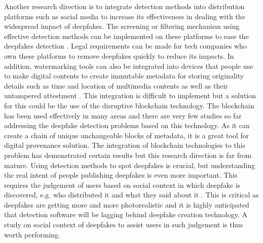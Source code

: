 Another research direction is to integrate detection methods into distribution platforms such as social media to increase its effectiveness in dealing with the widespread impact of deepfakes. The screening or filtering mechanism using effective detection methods can be implemented on these platforms to ease the deepfakes detection . Legal requirements can be made for tech companies who own these platforms to remove deepfakes quickly to reduce its impacts. In addition, watermarking tools can also be integrated into devices that people use to make digital contents to create immutable metadata for storing originality details such as time and location of multimedia contents as well as their untampered attestment . This integration is difficult to implement but a solution for this could be the use of the disruptive blockchain technology. The blockchain has been used effectively in many areas and there are very few studies so far addressing the deepfake detection problems based on this technology. As it can create a chain of unique unchangeable blocks of metadata, it is a great tool for digital provenance solution. The integration of blockchain technologies to this problem has demonstrated certain results  but this research direction is far from mature.
Using detection methods to spot deepfakes is crucial, but understanding the real intent of people publishing deepfakes is even more important. This requires the judgement of users based on social context in which deepfake is discovered, e.g. who distributed it and what they said about it . This is critical as deepfakes are getting more and more photorealistic and it is highly anticipated that detection software will be lagging behind deepfake creation technology. A study on social context of deepfakes to assist users in such judgement is thus worth performing. 
